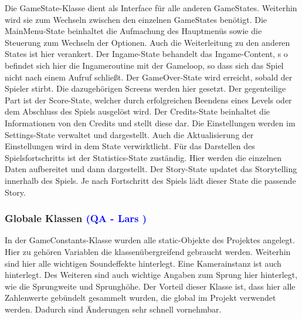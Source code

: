 \documentclass[12pt]{article}
\begin{document}
Die GameState-Klasse dient als Interface für alle anderen GameStates. Weiterhin wird sie zum Wechseln zwischen den einzelnen GameStates benötigt.\newline\newline
Die MainMenu-State beinhaltet die Aufmachung des Hauptmenüs sowie die Steuerung zum Wechseln der Optionen. Auch die Weiterleitung zu den
anderen States ist hier verankert.\newline\newline
Der Ingame-State behandelt das Ingame-Content, s o befindet sich hier die Ingameroutine mit der Gameloop, so dass sich das Spiel nicht nach einem Aufruf schließt.\newline\newline
Der GameOver-State wird erreicht, sobald der Spieler stirbt. Die dazugehörigen Screens werden hier gesetzt.\newline\newline
Der gegenteilige Part ist der Score-State, welcher durch erfolgreichen Beendens eines Levels oder dem Abschluss des Spiels ausgelöst wird.\newline\newline
Der Credits-State beinhaltet die Informationen von den Credits und stellt diese dar. Die Einstellungen werden im Settings-State verwaltet und dargestellt.
Auch die Aktualisierung der Einstellungen wird in dem State verwirktlicht.\newline\newline
Für das Darstellen des Spielsfortschritts ist der Statistics-State zuständig. Hier werden die einzelnen Daten aufbereitet und dann dargestellt.\newline\newline
Der Story-State updatet das Storytelling innerhalb des Spiels. Je nach Fortschritt des Spiels lädt dieser State die passende Story.

\vspace{1cm}
\subsubsection{Globale Klassen \textcolor{blue}{(QA - Lars )}}

In der GameConstants-Klasse wurden alle static-Objekte des Projektes angelegt. Hier zu gehören Variablen die klassenübergreifend gebraucht werden.
Weiterhin sind hier alle wichtigen Soundeffekte hinterlegt. Eine Kamerainstanz ist auch hinterlegt. Des Weiteren sind auch wichtige Angaben zum Sprung
hier hinterlegt, wie die Sprungweite und Sprunghöhe. Der Vorteil dieser Klasse ist, dass hier alle Zahlenwerte gebündelt gesammelt wurden, die global im
Projekt verwendet werden. Dadurch sind Änderungen sehr schnell vornehmbar.
\end{document}
